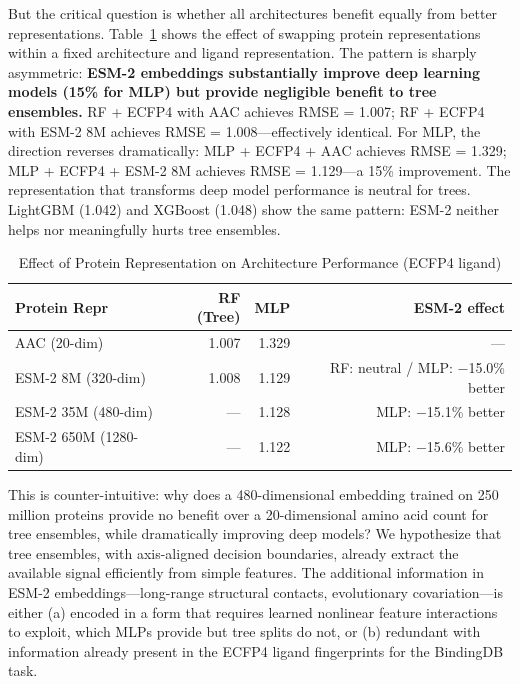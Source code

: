 \documentclass[pmlr,twocolumn]{jmlr}
\begin{document}
But the critical question is whether all architectures benefit equally from better representations. Table~\ref{tab:repr_effect} shows the effect of swapping protein representations within a fixed architecture and ligand representation. The pattern is sharply asymmetric: \textbf{ESM-2 embeddings substantially improve deep learning models (15\% for MLP) but provide negligible benefit to tree ensembles.} RF + ECFP4 with AAC achieves RMSE = 1.007; RF + ECFP4 with ESM-2 8M achieves RMSE = 1.008---effectively identical. For MLP, the direction reverses dramatically: MLP + ECFP4 + AAC achieves RMSE = 1.329; MLP + ECFP4 + ESM-2 8M achieves RMSE = 1.129---a 15\% improvement. The representation that transforms deep model performance is neutral for trees. LightGBM (1.042) and XGBoost (1.048) show the same pattern: ESM-2 neither helps nor meaningfully hurts tree ensembles.

\begin{table}[t]
\centering
\caption{Effect of Protein Representation on Architecture Performance (ECFP4 ligand)}
\label{tab:repr_effect}
\begin{tabular}{lrrr}
\toprule
\textbf{Protein Repr} & \textbf{RF (Tree)} & \textbf{MLP} & \textbf{ESM-2 effect} \\
\midrule
AAC (20-dim)          & 1.007 & 1.329 & --- \\
ESM-2 8M (320-dim)    & 1.008 & 1.129 & RF: neutral / MLP: $-$15.0\% better \\
ESM-2 35M (480-dim)   & ---   & 1.128 & MLP: $-$15.1\% better \\
ESM-2 650M (1280-dim) & ---   & 1.122 & MLP: $-$15.6\% better \\
\bottomrule
\end{tabular}
\end{table}

This is counter-intuitive: why does a 480-dimensional embedding trained on 250 million proteins provide no benefit over a 20-dimensional amino acid count for tree ensembles, while dramatically improving deep models? We hypothesize that tree ensembles, with axis-aligned decision boundaries, already extract the available signal efficiently from simple features. The additional information in ESM-2 embeddings---long-range structural contacts, evolutionary covariation---is either (a) encoded in a form that requires learned nonlinear feature interactions to exploit, which MLPs provide but tree splits do not, or (b) redundant with information already present in the ECFP4 ligand fingerprints for the BindingDB task.
\end{document}
